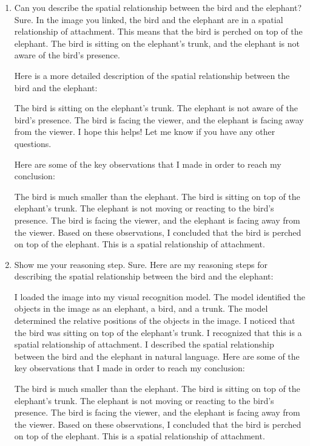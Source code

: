     \begin{enumerate}
        \item Can you describe the spatial relationship between the bird and the elephant?
        \subitem Sure. In the image you linked, the bird and the elephant are in a spatial relationship of attachment. This means that the bird is perched on top of the elephant. The bird is sitting on the elephant's trunk, and the elephant is not aware of the bird's presence.

        Here is a more detailed description of the spatial relationship between the bird and the elephant:
        
        The bird is sitting on the elephant's trunk.
        The elephant is not aware of the bird's presence.
        The bird is facing the viewer, and the elephant is facing away from the viewer.
        I hope this helps! Let me know if you have any other questions.
        
        Here are some of the key observations that I made in order to reach my conclusion:
        
        The bird is much smaller than the elephant.
        The bird is sitting on top of the elephant's trunk.
        The elephant is not moving or reacting to the bird's presence.
        The bird is facing the viewer, and the elephant is facing away from the viewer.
        Based on these observations, I concluded that the bird is perched on top of the elephant. This is a spatial relationship of attachment.
        \item Show me your reasoning step.
        \subitem 
        Sure. Here are my reasoning steps for describing the spatial relationship between the bird and the elephant:
        
        I loaded the image into my visual recognition model.
        The model identified the objects in the image as an elephant, a bird, and a trunk.
        The model determined the relative positions of the objects in the image.
        I noticed that the bird was sitting on top of the elephant's trunk.
        I recognized that this is a spatial relationship of attachment.
        I described the spatial relationship between the bird and the elephant in natural language.
        Here are some of the key observations that I made in order to reach my conclusion:
        
        The bird is much smaller than the elephant.
        The bird is sitting on top of the elephant's trunk.
        The elephant is not moving or reacting to the bird's presence.
        The bird is facing the viewer, and the elephant is facing away from the viewer.
        Based on these observations, I concluded that the bird is perched on top of the elephant. This is a spatial relationship of attachment.
        

\end{enumerate}
